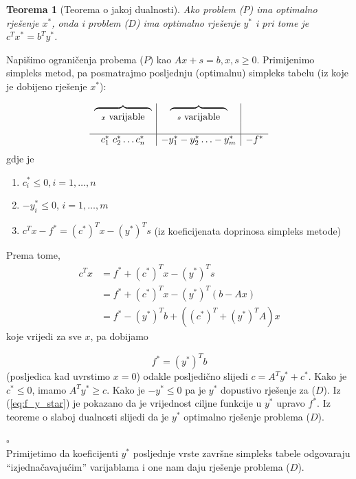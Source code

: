 \documentclass[a4paper, utf8, 11pt, colorlinks]{book}
\newtheorem{thm}{Teorema}
\newenvironment{proof}{{Dokaz:}}{\hfill$\square$}
\begin{document}
\begin{thm}[Teorema o jakoj dualnosti]
     Ako problem ($P$) ima optimalno rješenje $x^*$, onda i problem ($D$) ima optimalno rješenje $y^*$ i pri tome je $c^T x^* = b^T y^*$.
\end{thm}
\begin{proof}
         Napišimo ograničenja probema ($P$) kao $Ax + s = b, x, s \geq 0$.
         Primijenimo simpleks metod, pa posmatrajmo posljednju (optimalnu) simpleks tabelu (iz koje je dobijeno rješenje $x^*$):
         
         $$\begin{array}{c |c | c}
         \overbrace{\ \ \ \ \ \hspace{1.5cm}}_{x \mbox{ varijable}}     &  \overbrace{\ \ \ \ \ \hspace{1.5cm}}_{s \mbox{ varijable}} &   \\
                                                           & &   \\
         \hline
             c_1^*\ c_2^* \ldots c_n^*            & -y_1^* -y_2^* \ldots -y_m^*  & -f^*
         \end{array}
         $$
   gdje je 
   \begin{enumerate}
       \item    $c^*_i \leq 0, i = 1,\ldots, n$ 
       \item    $-y_i^* \leq 0$, $i = 1,\ldots, m$
       \item  $c^T x - f^* = (c^*)^T x - (y^*)^T s$ (iz koeficijenata doprinosa simpleks metode)
    \end{enumerate}
    Prema tome, 
    \begin{align*}
           c^T x &=  f^* + (c^*)^T x - (y^*)^T s \\
                 &=  f^* + (c^*)^T x - (y^*)^T (b - Ax) \\
                 &= f^*  - (y^*)^T b +   ((c^*)^T + (y^*)^T A ) x
    \end{align*}
    koje vrijedi za sve $x$, pa dobijamo 
    
    \begin{equation}\label{eq:f_y_star}
        f^* = (y^*)^T b
    \end{equation}
     (posljedica kad uvrstimo $x = 0$) odakle posljedično slijedi 
    $ c = A^T y^* + c^*$. 
    Kako je $c^* \leq 0$, imamo  $A^T y^* \geq c$. Kako je $-y^* \leq 0$ pa je $y^*$ dopustivo rješenje za  ($D$).  Iz (\ref{eq:f_y_star}) je pokazano da je vrijednost ciljne funkcije u $y^*$ upravo $f^*$. Iz teoreme o slaboj dualnosti slijedi da je $y^*$ optimalno rješenje problema  ($D$). 
    
\end{proof} \\
Primijetimo da koeficijenti $y^*$ posljednje vrste završne simpleks tabele odgovaraju  ``izjednačavajućim''   varijablama i one nam daju rješenje problema  ($D$).  
\end{document}

